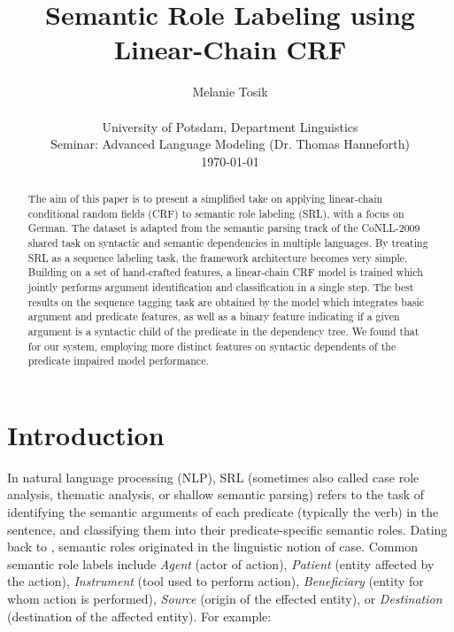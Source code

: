 \documentclass[a4paper,twoside,12pt]{article}
\begin{document}
\title{Semantic Role Labeling using Linear-Chain CRF}
\author{Melanie Tosik\\\\
\small University of Potsdam, Department Linguistics\\
\small Seminar: Advanced Language Modeling (Dr. Thomas Hanneforth)\\
\small \today}
\date{}
\maketitle

\pagestyle{myheadings}
\thispagestyle{empty}

\begin{abstract}
\noindent
The aim of this paper is to present a simplified take on applying linear-chain conditional random fields (CRF) to semantic role labeling (SRL), with a focus on German. The dataset is adapted from the semantic parsing track of the CoNLL-2009 shared task on syntactic and semantic dependencies in multiple languages. By treating SRL as a sequence labeling task, the framework architecture becomes very simple. Building on a set of hand-crafted features, a linear-chain CRF model is trained which jointly performs argument identification and classification in a single step. The best results on the sequence tagging task are obtained by the model which integrates basic argument and predicate features, as well as a binary feature indicating if a given argument is a syntactic child of the predicate in the dependency tree. We found that for our system, employing more distinct features on syntactic dependents of the predicate impaired model performance.

\end{abstract}

\section{Introduction}
\label{sec:intro}

In natural language processing (NLP), SRL (sometimes also called case role analysis, thematic analysis, or shallow semantic parsing) refers to the task of identifying the semantic arguments of each predicate (typically the verb) in the sentence, and classifying them into their predicate-specific semantic roles. Dating back to \cite{fillmore}, semantic roles originated in the linguistic notion of case. Common semantic role labels include \textit{Agent} (actor of action), \textit{Patient} (entity affected by the action), \textit{Instrument} (tool used to perform action), \textit{Beneficiary} (entity for whom action is performed), \textit{Source} (origin of the effected entity), or \textit{Destination} (destination of the affected entity). For example:
\end{document}
